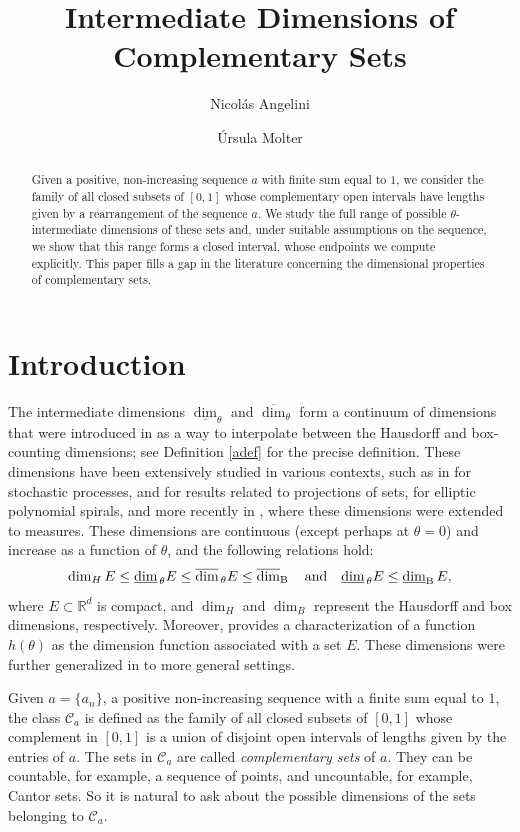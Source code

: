 \documentclass[11pt,reqno,bookmarksnumbered,raiselinks,breaklinks,colorlinks,plainpages]{amsart}
\title[Intermediate Dimensions of Complementary Sets]{Intermediate Dimensions of Complementary Sets}
\author{Nicolás Angelini}
\author{Úrsula Molter}
\newcommand\ubd{\overline{\mbox{\rm dim}}_{\rm B}\,} %
\newcommand\lbd{\underline{\mbox{\rm dim}}_{\rm B}\,} %
\newcommand\da{\underline{\mbox{\rm dim}}_{\,\theta}} %
\newcommand\uda{\overline{\mbox{\rm dim}}_{\,\theta}} %
\begin{document}
\begin{abstract}
  Given a positive, non-increasing sequence $a$ with finite sum equal to $1$, we consider the family of all closed subsets of $[0,1]$ whose complementary open intervals have lengths given by a rearrangement of the sequence $a$. We study the full range of possible $\theta$-intermediate dimensions of these sets and, under suitable assumptions on the sequence, we show that this range forms a closed interval, whose endpoints we compute explicitly. This paper fills a gap in the literature concerning the dimensional properties of complementary sets.
\end{abstract}
\maketitle

\section{Introduction}

The intermediate dimensions $\underline{\dim}_\theta$ and $\overline{\dim}_\theta$ form a continuum of dimensions that were introduced in \cite{FFK} as a way to interpolate between the Hausdorff and box-counting dimensions; see Definition \ref{adef} for the precise definition. These dimensions have been extensively studied in various contexts, such as in \cite{Brownian1} for stochastic processes, \cite{BFF} and \cite{angelini} for results related to projections of sets, \cite{BFF2} for elliptic polynomial spirals, and more recently in \cite{angelini2}, where these dimensions were extended to measures. These dimensions are continuous (except perhaps at $\theta=0$) and increase as a function of $\theta$, and the following relations hold:
\[\dim_H E \leq \da E \leq \uda E \leq \ubd \quad \text{and} \quad \da E \leq \lbd E,\]
where $E \subset \mathbb{R}^d$ is compact, and $\dim_H$ and $\dim_B$ represent the Hausdorff and box dimensions, respectively. Moreover, \cite{Banaji-R22} provides a characterization of a function $h(\theta)$ as the dimension function associated with a set $E$. These dimensions were further generalized in \cite{Banaji} to more general settings.

Given $a=\{a_n\}$, a positive non-increasing sequence with a finite sum equal to $1$, the class $\mathcal{C}_a$ is defined as the family of all closed subsets of $[0,1]$ whose complement in $[0,1]$ is a union of disjoint open intervals of lengths given by the entries of $a$. The sets in $\mathcal{C}_a$ are called \textit{complementary sets} of $a$. They can be countable, for example, a sequence of points, and uncountable, for example, Cantor sets. So it is natural to ask about the possible dimensions of the sets belonging to $\mathcal{C}_a$.
\end{document}
